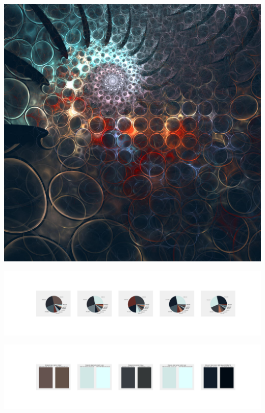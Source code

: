 \documentclass[11pt]{article}
\begin{document}
\begin{landscape}
    \begin{center}
    \includegraphics[width=\textwidth]{./nbimg/file (229).jpg}
    \end{center}

    \begin{center}
    \includegraphics[width=250mm]{./nbimg/pie-144.jpg}
    \end{center}

    \begin{center}
    \includegraphics[width=250mm]{./nbimg/peak-144.jpg}
    \end{center}
    


\end{landscape}
\end{document}
